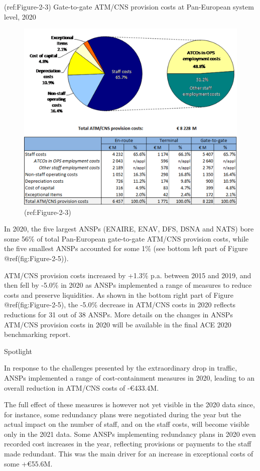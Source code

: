 \documentclass[
]{book}
\begin{document}
(ref:Figure-2-3) Gate-to-gate ATM/CNS provision costs at Pan-European
system level, 2020

\begin{figure}

{\centering \includegraphics[width=0.7\linewidth]{figures/Figure-2-3} 

}

\caption{(ref:Figure-2-3)}\label{fig:Figure-2-3}
\end{figure}

In 2020, the five largest ANSPs (ENAIRE, ENAV, DFS, DSNA and NATS) bore
some 56\% of total Pan-European gate-to-gate ATM/CNS provision costs,
while the five smallest ANSPs accounted for some 1\% (see bottom left
part of Figure @ref(fig:Figure-2-5)).

ATM/CNS provision costs increased by +1.3\% p.a. between 2015 and 2019,
and then fell by -5.0\% in 2020 as ANSPs implemented a range of measures
to reduce costs and preserve liquidities. As shown in the bottom right
part of Figure @ref(fig:Figure-2-5), the -5.0\% decrease in ATM/CNS
costs in 2020 reflects reductions for 31 out of 38 ANSPs. More details
on the changes in ANSPs ATM/CNS provision costs in 2020 will be
available in the final ACE 2020 benchmarking report.

Spotlight

In response to the challenges presented by the extraordinary drop in
traffic, ANSPs implemented a range of cost-containment measures in 2020,
leading to an overall reduction in ATM/CNS costs of -€433.4M.

The full effect of these measures is however not yet visible in the 2020
data since, for instance, some redundancy plans were negotiated during
the year but the actual impact on the number of staff, and on the staff
costs, will become visible only in the 2021 data. Some ANSPs
implementing redundancy plans in 2020 even recorded cost increases in
the year, reflecting provisions or payments to the staff made redundant.
This was the main driver for an increase in exceptional costs of some
+€55.6M.
\end{document}
